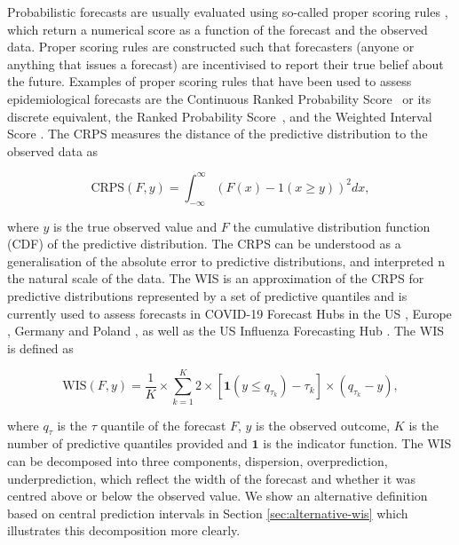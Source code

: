 \documentclass{article}
\begin{document}
Probabilistic forecasts are usually evaluated using so-called proper scoring rules \citep{gneitingStrictlyProperScoring2007}, which return a numerical score as a function of the forecast and the observed data. Proper scoring rules are constructed such that forecasters (anyone or anything that issues a forecast) are incentivised to report their true belief about the future. Examples of proper scoring rules that have been used to assess epidemiological forecasts are the Continuous Ranked Probability Score~\citep[CRPS,][]{gneitingStrictlyProperScoring2007} or its discrete equivalent, the Ranked Probability Score~\citep[RPS,][]{funkAssessingPerformanceRealtime2019}, and the Weighted Interval Score \citep{bracherEvaluatingEpidemicForecasts2021}. 
The CRPS measures the distance of the predictive distribution to the observed data as 
\begin{linenomath*}
\begin{equation*}
    \text{CRPS}(F, y) = \int_{-\infty}^\infty \left( F(x) - 1(x \geq y) \right)^2 dx,
\end{equation*}    
\end{linenomath*}
where $y$ is the true observed value and $F$ the cumulative distribution function (CDF) of the predictive distribution. The CRPS can be understood as a generalisation of the absolute error to predictive distributions, and interpreted n the natural scale of the data. The WIS is an approximation of the CRPS for predictive distributions represented by a set of predictive quantiles and is currently used to assess forecasts in COVID-19 Forecast Hubs in the US \citep{cramerCOVID19ForecastHub2020, cramerEvaluationIndividualEnsemble2021}, Europe \citep{sherrattPredictivePerformanceMultimodel2022}, Germany and Poland \citep{bracherShorttermForecastingCOVID192021, bracherNationalSubnationalShortterm2021}, as well as the US Influenza Forecasting Hub \citep{CdcepiFlusightforecastdata2022}. The WIS is defined as 
\begin{linenomath*}
\begin{equation*}
    \text{WIS}(F, y) = \frac{1}{K} \times \sum_{k = 1}^{K} 2 \times \left[ \boldsymbol{1}(y \leq q_{\tau_k}) - \tau_k \right] \times ( q_{\tau_k} - y), 
\end{equation*}
\end{linenomath*}
where $q_{\tau}$ is the $\tau$ quantile of the forecast $F$, $y$ is the observed outcome, $K$ is the number of predictive quantiles provided and $\boldsymbol{1}$ is the indicator function. The WIS can be decomposed into three components, dispersion, overprediction, underprediction, which reflect the width of the forecast and whether it was centred above or below the observed value. We show an alternative definition based on central prediction intervals in Section \ref{sec:alternative-wis} which illustrates this decomposition more clearly. 
\end{document}
